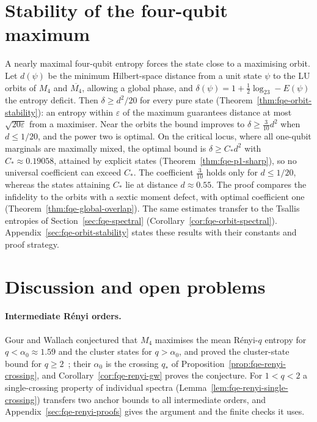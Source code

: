 \documentclass[11pt]{article}
\begin{document}




\section{Stability of the four-qubit maximum}\label{sec:fqe-stability-summary}
A nearly maximal four-qubit entropy forces the state close to a maximising orbit. Let $d(\psi)$ be the minimum Hilbert-space
distance from a unit state $\psi$ to the LU orbits of $M_4$ and $\overline{M_4}$, allowing a global phase, and
$\delta(\psi)=1+\frac12\log_23-E(\psi)$ the entropy deficit. Then $\delta\ge d^2/20$ for every pure state
(Theorem~\ref{thm:fqe-orbit-stability}): an entropy within $\varepsilon$ of the maximum guarantees distance at most
$\sqrt{20\varepsilon}$ from a maximiser. Near the orbits the bound improves to $\delta\ge\frac3{10}d^2$ when $d\le1/20$,
and the power two is optimal. On the critical locus, where all one-qubit marginals are maximally mixed, the optimal
bound is $\delta\ge C_*d^2$ with $C_*\approx0.19058$, attained by explicit states (Theorem~\ref{thm:fqe-p1-sharp}),
so no universal coefficient can exceed $C_*$. The coefficient
$\tfrac3{10}$ holds only for $d\le1/20$, whereas the states attaining $C_*$ lie at distance $d\approx0.55$. The proof compares the infidelity to the orbits with a sextic moment
defect, with optimal coefficient one (Theorem~\ref{thm:fqe-global-overlap}). The same estimates transfer
to the Tsallis entropies of Section~\ref{sec:fqe-spectral} (Corollary~\ref{cor:fqe-orbit-spectral}).
Appendix~\ref{sec:fqe-orbit-stability} states these results with their constants and proof strategy.




\section{Discussion and open problems}\label{sec:fqe-discussion}

\paragraph{Intermediate R\'enyi orders.} Gour and Wallach conjectured that $M_4$ maximises the mean
R\'enyi-$q$ entropy for $q<\alpha_0\approx1.59$ and the cluster states for $q>\alpha_0$, and proved the
cluster-state bound for $q\ge2$~\cite[Fig.~2 and Theorem~12]{GW}; their $\alpha_0$ is the crossing $q_*$ of
Proposition~\ref{prop:fqe-renyi-crossing}, and Corollary~\ref{cor:fqe-renyi-gw} proves the conjecture. For $1<q<2$ a
single-crossing property of individual spectra (Lemma~\ref{lem:fqe-renyi-single-crossing}) transfers two anchor bounds to
all intermediate orders, and Appendix~\ref{sec:fqe-renyi-proofs} gives the argument and the finite checks it uses.
\end{document}

